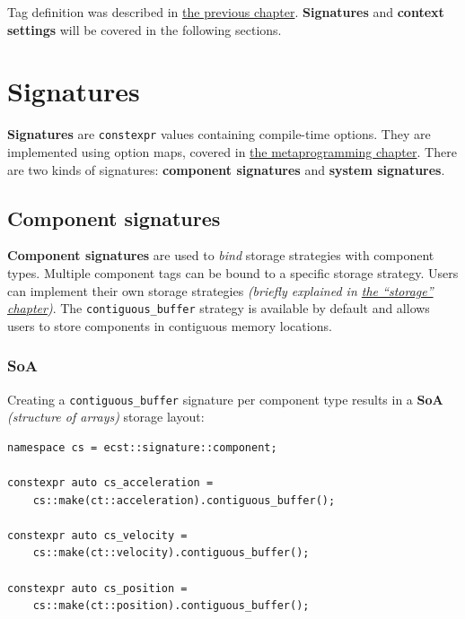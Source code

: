 \documentclass[twoside, 12pt, a4paper, openany]{book}
\begin{document}
Tag definition was described in
\protect\hyperlink{metaprogramming_tags}{the previous chapter}.
\textbf{Signatures} and \textbf{context settings} will be covered in the
following sections.

\section{Signatures}\label{signatures}

\textbf{Signatures} are
\texttt{constexpr}
values containing compile-time options. They are implemented using
option maps, covered in
\protect\hyperlink{metaprogramming_option_maps}{the metaprogramming
chapter}. There are two kinds of signatures: \textbf{component
signatures} and \textbf{system signatures}.

\subsection{Component signatures}\label{component-signatures}

\textbf{Component signatures} are used to \emph{bind} storage strategies
with component types. Multiple component tags can be bound to a specific
storage strategy. Users can implement their own storage strategies
\emph{(briefly explained in
\protect\hyperlink{storage_comp_strategy}{the ``storage'' chapter})}.
The
\texttt{contiguous_buffer}
strategy is available by default and allows users to store components in
contiguous memory locations.

\subsubsection{SoA}\label{soa}

Creating a
\texttt{contiguous_buffer}
signature per component type results in a \textbf{SoA} \emph{(structure
of arrays)} storage layout:

\begin{verbatim}
namespace cs = ecst::signature::component;

constexpr auto cs_acceleration =
    cs::make(ct::acceleration).contiguous_buffer();

constexpr auto cs_velocity =
    cs::make(ct::velocity).contiguous_buffer();

constexpr auto cs_position =
    cs::make(ct::position).contiguous_buffer();
\end{verbatim}
\end{document}

